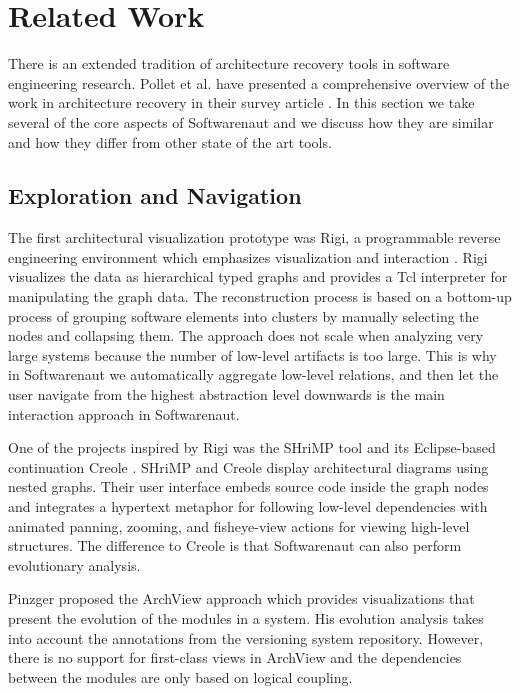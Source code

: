 \documentclass[preprint,12pt]{elsarticle}
\begin{document}
\section {Related Work} \label {sec:rel}

There is an extended tradition of architecture recovery tools in software engineering research. Pollet et al. have presented a comprehensive overview of the work in architecture recovery in their survey article \cite{pollet-sar}. In this section we take several of the core aspects of Softwarenaut and we discuss how they are similar and how they differ from other state of the art tools.

\subsection {Exploration and Navigation} 

The first architectural visualization prototype was Rigi, a programmable reverse engineering environment which emphasizes visualization and interaction \cite{muller-revengenv}. Rigi  visualizes the data as hierarchical typed graphs and provides a Tcl interpreter for manipulating the graph data. The reconstruction process is based on a bottom-up process of grouping  software elements into clusters by manually selecting the nodes and collapsing them. The approach does not scale when analyzing very large systems because the number of low-level artifacts is too large. This is why in Softwarenaut we automatically aggregate low-level relations, and then let the user navigate from the highest abstraction level downwards is the main interaction approach in Softwarenaut. 

One of the projects inspired by Rigi was the SHriMP tool \cite{storey-shrimp} and its Eclipse-based continuation Creole \cite{lintern-creole}. SHriMP and Creole display architectural diagrams using nested graphs. Their user interface embeds source code inside the graph nodes and integrates a hypertext metaphor for following low-level dependencies with animated panning, zooming, and fisheye-view actions for viewing high-level structures. The difference to Creole is that Softwarenaut can also perform evolutionary analysis.

Pinzger proposed the ArchView approach \cite{pinzger-thesis} which provides visualizations that present the evolution of the modules in a system. His evolution analysis takes into account the annotations from the versioning system repository. However, there is no support for first-class views in ArchView and the dependencies between the modules are only based on logical coupling. 
\end{document}
